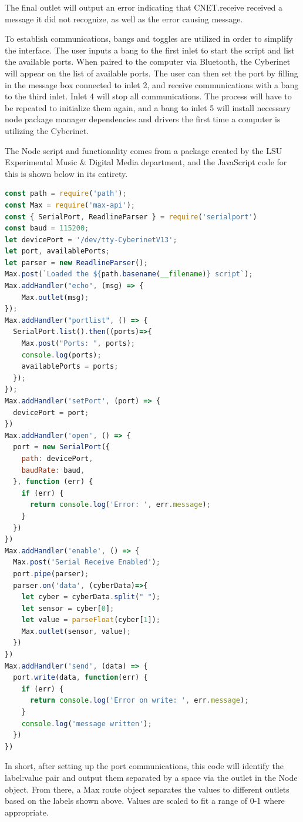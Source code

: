 The final outlet will output an error indicating that CNET.receive received a message it did not recognize, as well as the error causing message.

To establish communications, bangs and toggles are utilized in order to simplify the interface. The user inputs a bang to the first inlet to start the script and list the available ports. When paired to the computer via Bluetooth, the Cyberinet will appear on the list of available ports. The user can then set the port by filling in the message box connected to inlet 2, and receive communications with a bang to the third inlet. Inlet 4 will stop all communications. The process will have to be repeated to initialize them again, and a bang to inlet 5 will install necessary node package manager dependencies and drivers the first time a computer is utilizing the Cyberinet.

The Node script and functionality comes from a package created by the LSU Experimental Music \& Digital Media department, and the JavaScript code for this is shown below in its entirety.

\begin{lstlisting}[language=JavaScript] 
const path = require('path');
const Max = require('max-api');
const { SerialPort, ReadlineParser } = require('serialport')
const baud = 115200;
let devicePort = '/dev/tty-CyberinetV13';
let port, availablePorts;
let parser = new ReadlineParser();
Max.post(`Loaded the ${path.basename(__filename)} script`);
Max.addHandler("echo", (msg) => {
	Max.outlet(msg);
});
Max.addHandler("portlist", () => {
  SerialPort.list().then((ports)=>{
    Max.post("Ports: ", ports);
    console.log(ports);
    availablePorts = ports;
  });
});
Max.addHandler('setPort', (port) => {
  devicePort = port;
})
Max.addHandler('open', () => {
  port = new SerialPort({
    path: devicePort,
    baudRate: baud,
  }, function (err) {
    if (err) {
      return console.log('Error: ', err.message);
    }
  })
})
Max.addHandler('enable', () => {
  Max.post('Serial Receive Enabled');
  port.pipe(parser);
  parser.on('data', (cyberData)=>{
    let cyber = cyberData.split(" ");
    let sensor = cyber[0];
    let value = parseFloat(cyber[1]);
    Max.outlet(sensor, value);
  })
})
Max.addHandler('send', (data) => {
  port.write(data, function(err) {
    if (err) {
      return console.log('Error on write: ', err.message);
    }
    console.log('message written');
  })
})
\end{lstlisting}

In short, after setting up the port communications, this code will identify the label:value pair and output them separated by a space via the outlet in the Node object. From there, a Max route object separates the values to different outlets based on the labels shown above. Values are scaled to fit a range of 0-1 where appropriate.

